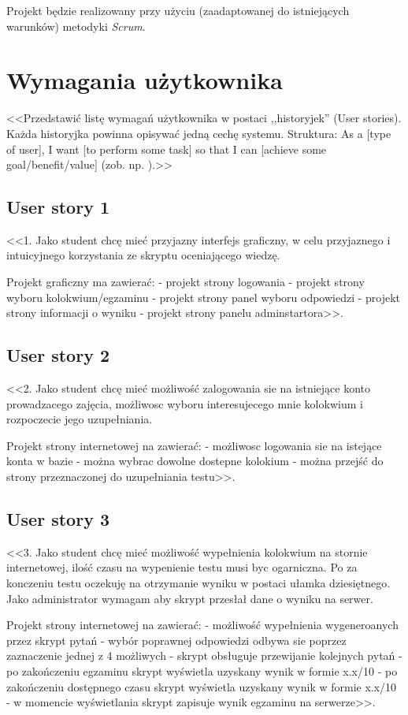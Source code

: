 \documentclass[a4paper]{article}
\begin{document}
Projekt będzie realizowany przy użyciu (zaadaptowanej do istniejących warunków) metodyki {\em Scrum}. 

\section{Wymagania użytkownika}
<<Przedstawić listę wymagań użytkownika w postaci ,,historyjek'' (User stories). Każda historyjka powinna opisywać jedną cechę systemu. Struktura: As a [type of user], I want [to perform some task] so that I can [achieve some goal/benefit/value] (zob. np. \cite{us}).>>

\subsection{User story 1}
<<1. 
Jako student chcę mieć przyjazny interfejs graficzny, w celu przyjaznego i intuicyjnego korzystania ze skryptu oceniającego wiedzę.

Projekt graficzny ma zawierać:
- projekt strony logowania
- projekt strony wyboru kolokwium/egzaminu
- projekt strony panel wyboru odpowiedzi
- projekt strony informacji o wyniku
- projekt strony panelu adminstartora>>.


\subsection{User story 2}
<<2.
Jako student chcę mieć możliwość zalogowania sie na istniejące konto prowadzacego zajęcia, możliwosc wyboru interesujecego mnie kolokwium i rozpoczecie jego uzupełniania.

Projekt strony internetowej na zawierać:
- możliwosc logowania sie na istejące konta w bazie
- można wybrac dowolne dostepne kolokium 
- można przejść do strony przeznaczonej do uzupełniania testu>>.


\subsection*{User story 3}
<<3.
Jako student chcę mieć możliwość wypełnienia kolokwium na stornie internetowej, ilość czasu na wypenienie testu musi byc ogarniczna. Po za konczeniu testu oczekuję na otrzymanie wyniku w postaci ułamka dziesiętnego. Jako administrator wymagam aby skrypt przesłał dane o wyniku na serwer.

Projekt strony internetowej na zawierać:
- możliwość wypełnienia wygeneroanych przez skrypt pytań
- wybór poprawnej odpowiedzi odbywa sie poprzez zaznaczenie jednej z 4 możliwych
- skrypt obsługuje przewijanie kolejnych pytań
- po zakończeniu egzaminu skrypt wyświetla uzyskany wynik w formie x.x/10
- po zakończeniu dostępnego czasu skrypt wyświetla uzyskany wynik w formie x.x/10
- w momencie wyświetlania skrypt zapisuje wynik egzaminu na serwerze>>.
\end{document}

